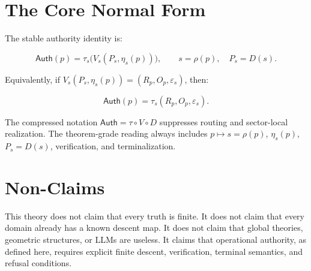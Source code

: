 \documentclass[11pt]{article}
\begin{document}
\section*{The Core Normal Form}

The stable authority identity is:

\[
\boxed{
\mathsf{Auth}(p)=
\tau_s\bigl(V_s(P_s,\eta_s(p))\bigr),
\qquad
s=\rho(p),
\quad
P_s=D(s).
}
\]

Equivalently, if \(V_s(P_s,\eta_s(p))=(R_p,O_p,\varepsilon_s)\), then:

\[
\boxed{
\mathsf{Auth}(p)=\tau_s(R_p,O_p,\varepsilon_s).
}
\]

The compressed notation \(\mathsf{Auth}=\tau\circ V\circ D\) suppresses routing and sector-local realization. The theorem-grade reading always includes \(p\mapsto s=\rho(p)\), \(\eta_s(p)\), \(P_s=D(s)\), verification, and terminalization.

\begin{abstract}
A system does not acquire authority by producing a representation, a prediction, a fluent explanation, or a global geometry. It acquires authority only when the claim descends into a finite certified regime with declared carriers, operators, verifiers, terminal statuses, and refusal conditions.

The governing identity is:

\[
\boxed{
\mathsf{Auth}
=
\tau\circ V\circ D
}
\]

The refusal law is:

\[
\boxed{
\neg D\Rightarrow\neg\mathsf{Auth}.
}
\]

Finite obstruction calculus is the local engine of this theory. It analyzes defects, repairs, quotient obstructions, witnesses, and licensed lifts inside a descended finite packet. Finite descent authority is the broader doctrine determining when any high-level proposal earns operational authority.
\end{abstract}

\section*{Non-Claims}

This theory does not claim that every truth is finite. It does not claim that every domain already has a known descent map. It does not claim that global theories, geometric structures, or LLMs are useless. It claims that operational authority, as defined here, requires explicit finite descent, verification, terminal semantics, and refusal conditions.
\end{document}
